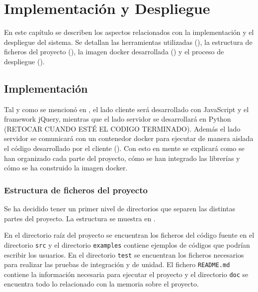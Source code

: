 \chapter{Implementación y Despliegue}\label{chap:implementacion_y_despliegue}
En este capítulo se describen los aspectos relacionados con la implementación y el despliegue del sistema. Se detallan las herramientas utilizadas (), la estructura de ficheros del proyecto (), la imagen docker desarrollada () y el proceso de despliegue ().

\section{Implementación} \label{sec:implementacion}
Tal y como se mencionó en , el lado cliente será desarrollado con JavaScript y el framework jQuery, mientras que el lado servidor se desarrollará en Python (RETOCAR CUANDO ESTÉ EL CODIGO TERMINADO). Además el lado servidor se comunicará con un contenedor docker para ejecutar de manera aislada el código desarrollado por el cliente (). Con esto en mente se explicará como se han organizado cada parte del proyecto, cómo se han integrado las librerías y cómo se ha construido la imagen docker. 

\subsection{Estructura de ficheros del proyecto}\label{subsec:estructura_ficheros_proyecto}

Se ha decidido tener un primer nivel de directorios que separen las distintas partes del proyecto. La estructura se muestra en .   

\begin{figure}[H]
    {
    \begin{tcolorbox}
    \end{tcolorbox}
    }
\end{figure}

En el directorio raíz del proyecto se encuentran los ficheros del código fuente en el directorio \texttt{src} y el directorio \texttt{examples} contiene ejemplos de códigos que podrían escribir los usuarios. En el directorio \texttt{test} se encuentran los ficheros necesarios para realizar las pruebas de integración y de unidad. El fichero \texttt{README.md} contiene la información necesaria para ejecutar el proyecto y el directorio \texttt{doc} se encuentra todo lo relacionado con la memoria sobre el proyecto.

